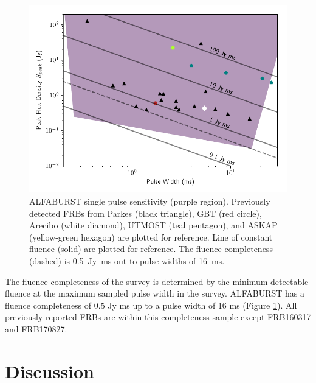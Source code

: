 \documentclass[a4paper,fleqn,usenatbib]{mnras}
\begin{document}
\begin{figure}
    \includegraphics[width=1.0\linewidth]{figures/sensitivity_range.pdf}
    \caption{ALFABURST single pulse sensitivity (purple region).
    Previously detected FRBs from Parkes (black triangle), GBT
    (red circle), Arecibo (white diamond), UTMOST (teal pentagon), and ASKAP
    (yellow-green hexagon) are plotted for reference. Line of constant fluence
    (solid) are plotted for reference. The fluence completeness (dashed) is
    0.5~Jy~ms out to pulse widths of 16~ms.
    }
    \label{fig:sensitivity_range}
\end{figure}



The fluence completeness of the survey \citep{2015MNRAS.447.2852K} is determined
by the minimum detectable fluence at the maximum sampled pulse width in the
survey. ALFABURST has a fluence completeness of $0.5$ Jy ms up to a pulse width
of 16 ms (Figure \ref{fig:sensitivity_range}). All previously reported FRBs are
within this completeness sample except FRB160317 and FRB170827.


\section{Discussion}
\label{sec:discuss}
\end{document}
